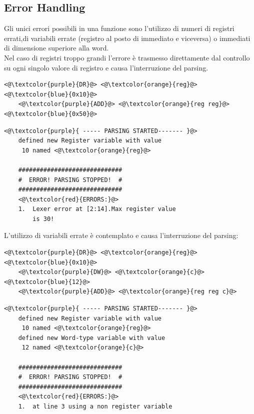 \subsection{Error Handling}
Gli unici errori possibili in una funzione sono l'utilizzo di numeri di registri errati,di variabili errate (registro al posto di immediato e viceversa) o immediati di dimensione superiore alla word.
\\Nel caso di registri troppo grandi l'errore è trasmesso direttamente dal controllo su ogni singolo valore di registro e causa l'interruzione del parsing.
\begin{lstlisting}[caption=input]
    <@\textcolor{purple}{DR}@> <@\textcolor{orange}{reg}@> <@\textcolor{blue}{0x10}@>
    <@\textcolor{purple}{ADD}@> <@\textcolor{orange}{reg reg}@> <@\textcolor{blue}{0x50}@> 
\end{lstlisting}

\begin{lstlisting}[caption=output]
    <@\textcolor{purple}{ ----- PARSING STARTED------- }@>
    defined new Register variable with value 
     10 named <@\textcolor{orange}{reg}@> 

    #############################
    #  ERROR! PARSING STOPPED!  #
    #############################
    <@\textcolor{red}{ERRORS:}@>
    1.	Lexer error at [2:14].Max register value 
        is 30!
\end{lstlisting}
\newpage
L'utilizzo di variabili errate è contemplato e causa l'interruzione del parsing:
\begin{lstlisting}[caption=input]
    <@\textcolor{purple}{DR}@> <@\textcolor{orange}{reg}@> <@\textcolor{blue}{0x10}@>
    <@\textcolor{purple}{DW}@> <@\textcolor{orange}{c}@> <@\textcolor{blue}{12}@>
    <@\textcolor{purple}{ADD}@> <@\textcolor{orange}{reg reg c}@> 
\end{lstlisting}
\begin{lstlisting}[caption=output]
    <@\textcolor{purple}{ ----- PARSING STARTED------- }@>
    defined new Register variable with value 
     10 named <@\textcolor{orange}{reg}@> 
    defined new Word-type variable with value 
     12 named <@\textcolor{orange}{c}@>
    
    #############################
    #  ERROR! PARSING STOPPED!  #
    #############################
    <@\textcolor{red}{ERRORS:}@>
    1.	at line 3 using a non register variable
\end{lstlisting}

\newpage
